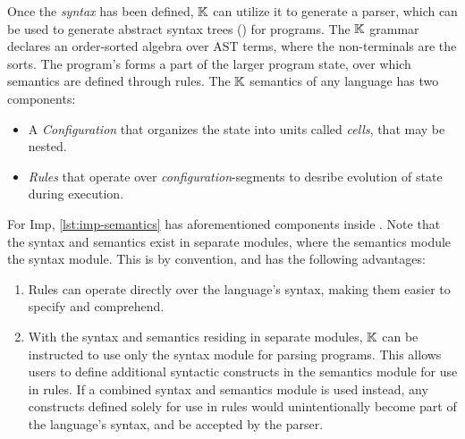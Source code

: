 Once the \emph{syntax} has been defined, $\mathbb{K}$ can utilize it to generate a
parser, which can be used to generate abstract
syntax trees (\ASTs{}) for programs. The $\mathbb{K}$ grammar declares an
order-sorted algebra over AST terms, where the non-terminals are
the sorts. The program's \AST{} forms a part of the larger
program state, over which semantics are defined through rules.
The $\mathbb{K}$ semantics of any language has two components:
\begin{itemize}
  \item A \emph{Configuration} that organizes the state
    into units called \emph{cells}, that may be nested.
  \item \emph{Rules} that operate over \emph{configuration}-segments
    to desribe evolution of state during execution.
\end{itemize}
For Imp, \autoref{lst:imp-semantics} has aforementioned
components inside .
Note that the syntax and semantics exist in separate modules,
where the semantics module 
the syntax module. This is by convention, and
has the following advantages:
\begin{enumerate}[label=\alph*)]
  \item Rules can operate directly over the language's syntax,
    making them easier to specify and comprehend.
  \item With the syntax and semantics residing in separate modules,
    $\mathbb{K}$ can be instructed to use only the syntax module for parsing programs.
    This allows users to define additional syntactic constructs in the semantics module
    for use in rules. If a combined syntax and semantics module is used instead,
    any constructs defined solely for use in rules
    would unintentionally become part of the language's syntax,
    and be accepted by the parser.
\end{enumerate}


